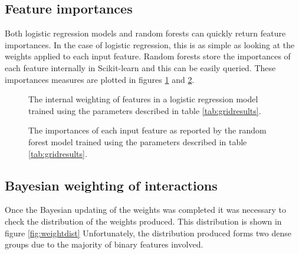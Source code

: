 \subsection{Feature importances}
\label{importances}

Both logistic regression models and random forests can quickly return feature importances.
In the case of logistic regression, this is as simple as looking at the weights applied to each input feature.
Random forests store the importances of each feature internally in Scikit-learn and this can be easily queried.
These importances measures are plotted in figures \ref{fig:logregweights} and \ref{fig:rfimportances}.

\begin{figure}
    \centering
    \setlength\figureheight{3in}
    \setlength\figurewidth{4in}
    \caption{The internal weighting of features in a logistic regression model trained using the parameters described in table \ref{tab:gridresults}.}
    \label{fig:logregweights}
\end{figure}

\begin{figure}
    \centering
    \setlength\figureheight{3in}
    \setlength\figurewidth{4in}
    \caption{The importances of each input feature as reported by the random forest model trained using the parameters described in table \ref{tab:gridresults}.}
    \label{fig:rfimportances}
\end{figure}

\subsection{Bayesian weighting of interactions}
\label{bayesresults}

Once the Bayesian updating of the weights was completed it was necessary to check the distribution of the weights produced.
This distribution is shown in figure \ref{fig:weightdist}
Unfortunately, the distribution produced forms two dense groups due to the majority of binary features involved.

